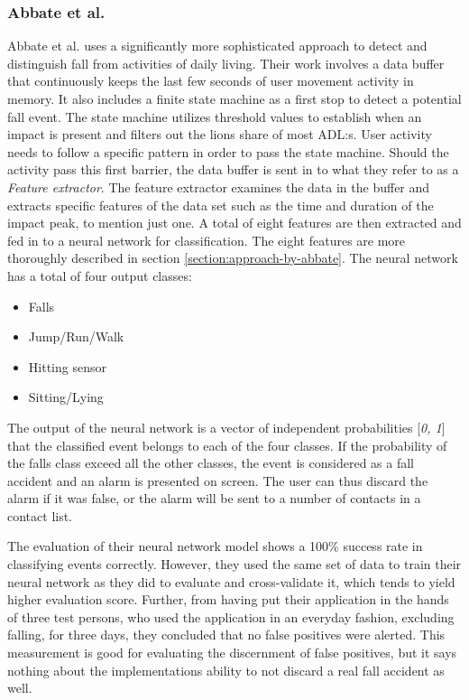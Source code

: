 \documentclass[12pt, a4paper, onecolumn]{article}
\begin{document}
	
	\subsubsection{Abbate et al.}
	Abbate et al. uses a significantly more sophisticated approach to detect and distinguish fall from activities of daily living. Their work involves a data buffer that continuously keeps the last few seconds of user movement activity in memory. It also includes a finite state machine as a first stop to detect a potential fall event. The state machine utilizes threshold values to establish when an impact is present and filters out the lions share of most ADL:s. User activity needs to follow a specific pattern in order to pass the state machine. Should the activity pass this first barrier, the data buffer is sent in to what they refer to as a \textit{Feature extractor}. The feature extractor examines the data in the buffer and extracts specific features of the data set such as the time and duration of the impact peak, to mention just one. A total of eight features are then extracted and fed in to a neural network for classification.  The eight features are more thoroughly described in section \ref{section:approach-by-abbate}. The neural network has a total of four output classes:
	
	\begin{itemize}
		\item Falls
		\item Jump/Run/Walk
		\item Hitting sensor
		\item Sitting/Lying
	\end{itemize}
	
	The output of the neural network is a vector of independent probabilities [\textit{0, 1}] that the classified event belongs to each of the four classes. If the probability of the falls class exceed all the other classes, the event is considered as a fall accident and an alarm is presented on screen. The user can thus discard the alarm if it was false, or the alarm will be sent to a number of contacts in a contact list. 
	
	The evaluation of their neural network model shows a 100\% success rate in classifying events correctly. However, they used the same set of data to train their neural network as they did to evaluate and cross-validate it, which tends to yield higher evaluation score. Further, from having put their application in the hands of three test persons, who used the application in an everyday fashion, excluding falling, for three days, they concluded that no false positives were alerted. This measurement is good for evaluating the discernment of false positives, but it says nothing about the implementations ability to not discard a real fall accident as well. 
	
\end{document}
